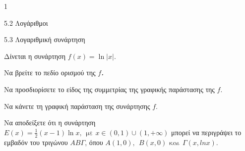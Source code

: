 \begin{ylh}{1}
\item 5.2 Λογάριθμοι
\item 5.3 Λογαριθμική συνάρτηση
\end{ylh}
Δίνεται η συνάρτηση $f(x) = \ln|x|$.
\begin{alist}
\item Να βρείτε το πεδίο ορισμού της $f$\emph{\textbf{.}}
\item Να προσδιορίσετε το είδος της συμμετρίας της γραφικής παράστασης της $f$.
\item Να κάνετε τη γραφική παράσταση της συνάρτησης $f$.
\item Να αποδείξετε ότι η συνάρτηση $Ε(x) = \frac{1}{2}(x - 1)\ln x,\ \ \text{με  }x \in (0,1) \cup (1, + \infty)$ μπορεί να περιγράψει το εμβαδόν του τριγώνου $ΑΒ\Gamma$, όπου $Α(1,0),\ \ B(x,0)\text{  και}\ \ \Gamma(x,lnx)$.
\end{alist}

